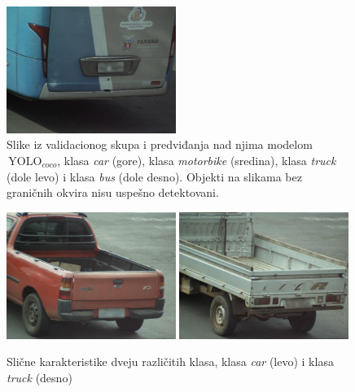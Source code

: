 \documentclass[12pt,oneside]{memoir}
\newcommand{\yolo}{\ensuremath{\,\textrm{YOLO}}}
\begin{document}
\begin{figure}[htbp]
      \includegraphics[width=0.49\textwidth]{matfmaster/yolo/v4/base/bus_0.jpg}
    \caption{Slike iz validacionog skupa i predviđanja nad njima modelom $\yolo_{coco}$, klasa \textit{car} (gore), klasa \textit{motorbike} (sredina),  klasa \textit{truck} (dole levo) i  klasa \textit{bus} (dole desno). Objekti na slikama bez graničnih okvira nisu uspešno detektovani.} \label{fig:section4_yolo4base_images}
\end{figure}

\begin{figure}[htbp]
    \centering
      \includegraphics[width=0.49\textwidth]{matfmaster/glava4/carproblem.jpg}
      \includegraphics[width=0.49\textwidth]{matfmaster/glava4/truckproblem.jpg}
    \caption{Slične karakteristike dveju različitih klasa, klasa \textit{car} (levo) i klasa \textit{truck} (desno) } \label{fig:section4_yolo4base_problemimages}
\end{figure}


\end{document}
